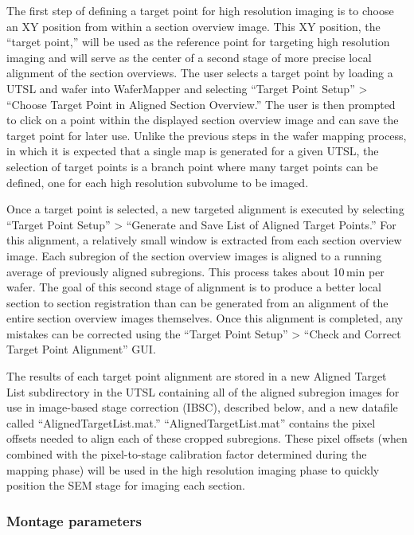 \documentclass{article}
\begin{document}
The first step of defining a target point for high resolution imaging is to choose an XY position from within a section overview image. This XY position, the “target point,” will be used as the reference point for targeting high resolution imaging and will serve as the center of a second stage of more precise local alignment of the section overviews. The user selects a target point by loading a UTSL and wafer into WaferMapper and selecting “Target Point Setup” > “Choose Target Point in Aligned Section Overview.” The user is then prompted to click on a point within the displayed section overview image and can save the target point for later use. Unlike the previous steps in the wafer mapping process, in which it is expected that a single map is generated for a given UTSL, the selection of target points is a branch point where many target points can be defined, one for each high resolution subvolume to be imaged.

Once a target point is selected, a new targeted alignment is executed by selecting “Target Point Setup” > “Generate and Save List of Aligned Target Points.” For this alignment, a relatively small window is extracted from each section overview image. Each subregion of the section overview images is aligned to a running average of previously aligned subregions. This process takes about 10\,min per wafer. The goal of this second stage of alignment is to produce a better local section to section registration than can be generated from an alignment of the entire section overview images themselves. Once this alignment is completed, any mistakes can be corrected using the “Target Point Setup” > “Check and Correct Target Point Alignment” GUI.

The results of each target point alignment are stored in a new Aligned Target List subdirectory in the UTSL containing all of the aligned subregion images for use in image-based stage correction (IBSC), described below, and a new datafile called “AlignedTargetList.mat.” “AlignedTargetList.mat” contains the pixel offsets needed to align each of these cropped subregions. These pixel offsets (when combined with the pixel-to-stage calibration factor determined during the mapping phase) will be used in the high resolution imaging phase to quickly position the SEM stage for imaging each section.

\subsubsection*{Montage parameters}
\end{document}
